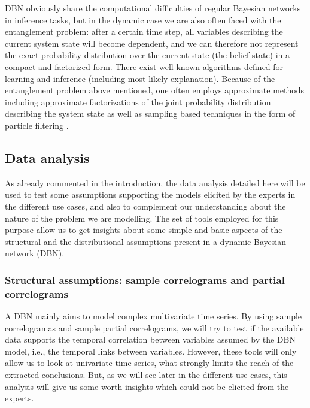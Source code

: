 DBN obviously share the computational difficulties of regular Bayesian networks in inference tasks, but in the dynamic case we are also often faced with the entanglement problem: after a certain time step, all variables describing the current system state will become dependent, and we can therefore not represent the exact probability distribution over the current state (the belief state) in a compact and factorized form. There exist well-known algorithms defined for learning and inference (including most likely explanation). Because of the entanglement problem above mentioned, one often employs approximate methods including approximate factorizations of the joint probability distribution describing the system state \cite{BoyenKoller1998} as well as sampling based techniques in the form of particle filtering \cite{Doucet2000}.

\subsection{Data analysis}\label{SubSection:DataAnalysis}

As already commented in the introduction, the data analysis detailed here will be used to test some assumptions supporting the models elicited by the experts in the different use cases, and also to complement our understanding about the nature of the problem we are modelling. The set of tools employed for this purpose allow us to get insights about some simple and basic aspects of the structural and the distributional assumptions present in a dynamic Bayesian network (DBN).

\subsubsection{Structural assumptions: sample correlograms and partial correlograms}

A DBN mainly aims to model complex multivariate time series. By using sample correlogramas and sample partial correlograms, we will try to test if the available data supports the temporal correlation between variables assumed by the DBN model, i.e., the temporal links between variables. However, these tools will only allow us to look at univariate time series, what strongly limits the reach of the  extracted conclusions. But, as we will see later in the different use-cases, this analysis will give us some worth insights which could not be elicited from the experts.  

